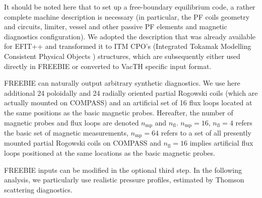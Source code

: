 It should be noted here that to set up a free-boundary equilibrium code, a rather complete machine description is necessary (in particular, the PF coils geometry and circuits, limiter, vessel and other passive PF elements and magnetic diagnostics configuration). We adopted the description that was already available for EFIT++ and transformed it to ITM CPO's (Integrated Tokamak Modelling Consistent Physical Objects \cite{Manduchi2008}) structures, which are subsequently either used directly in FREEBIE or converted to VacTH specific input format.

FREEBIE can naturally output arbitrary synthetic diagnostics. We use here additional 24 poloidally and 24 radially oriented partial Rogowski coils (which are actually mounted on COMPASS) and an artificial set of 16 flux loops located at the same positions as the basic magnetic probes. Hereafter, the number of magnetic probes and flux loops are denoted $n_\mathrm{mp}$ and $n_\mathrm{fl}$. $n_\mathrm{mp}=16$, $n_\mathrm{fl}=4$ refers the basic set of magnetic measurements, $n_\mathrm{mp}=64$ refers to a set of all presently mounted partial Rogowski coils on COMPASS and $n_\mathrm{fl}=16$ implies artificial flux loops positioned at the same locations as the basic magnetic probes.

FREEBIE inputs can be modified in the optional third step. In the following analysis, we particularly use realistic pressure profiles, estimated by Thomson scattering diagnostics.


